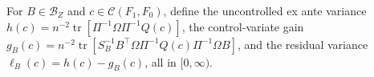 For \(B\in\mathcal B_Z\) and \(c\in\mathcal C(F_1,F_0)\), define the uncontrolled ex ante variance \(h(c)=n^{-2}\operatorname{tr}[\Pi^{-1}\Omega\Pi^{-1}Q(c)]\), the control-variate gain \(g_B(c)=n^{-2}\operatorname{tr}[S_B^{-1}B^{\top}\Omega\Pi^{-1}Q(c)\Pi^{-1}\Omega B]\), and the residual variance \(\ell_B(c)=h(c)-g_B(c)\), all in \([0,\infty)\).